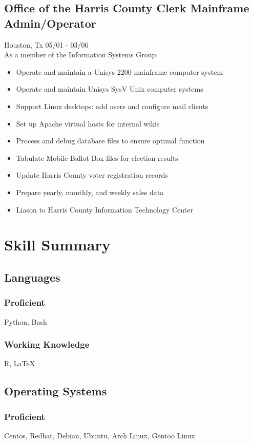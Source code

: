 \documentclass{article}
\begin{document}
  \subsection{Office of the Harris County Clerk \hfill Mainframe Admin/Operator}
  Houston, Tx \hfill 05/01 - 03/06\\
  As a member of the Information Systems Group:\\
  \begin{itemize}
  \item Operate and maintain a Unisys 2200 mainframe computer system
  \item Operate and maintain Unisys SysV Unix computer systems
  \item Support Linux desktops: add users and configure mail clients
  \item Set up Apache virtual hosts for internal wikis
  \item Process and debug database files to ensure optimal function
  \item Tabulate Mobile Ballot Box files for election results
  \item Update Harris County voter registration records
  \item Prepare yearly, monthly, and weekly sales data
  \item Liason to Harris County Information Technology Center
  \end{itemize}

\section{Skill Summary}
  \subsection{Languages}
    \subsubsection{Proficient}
    Python, Bash
    \subsubsection{Working Knowledge}
    R, {\LaTeX}

  \subsection{Operating Systems}
    \subsubsection{Proficient}
    Centos, Redhat, Debian, Ubuntu, Arch Linux, Gentoo Linux
\end{document}
